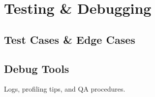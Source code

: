 \chapter{Testing \& Debugging}
\section{Test Cases \& Edge Cases}
\section{Debug Tools}
Logs, profiling tips, and QA procedures.
